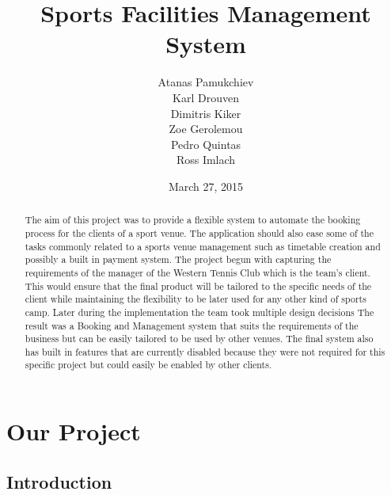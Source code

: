 \documentclass{l3proj}
\begin{document}
\title{Sports Facilities Management System}
\author{Atanas Pamukchiev \\
        Karl Drouven \\
        Dimitris Kiker \\
        Zoe Gerolemou \\
        Pedro Quintas\\
        Ross Imlach}
\date{March 27, 2015}
\maketitle
\begin{abstract}

The aim of this project was to provide a flexible system to automate the booking process for the clients of a sport venue. The application should also ease some of the tasks commonly related to a sports venue management such as timetable creation and possibly a built in payment system. The project begun with capturing the requirements of the manager of the Western Tennis Club which is the team's client. This would ensure that the final product will be tailored to the specific needs of the client while maintaining the flexibility to be later used for any other kind of sports camp. Later during the implementation the team took multiple design decisions  The result was a Booking and Management system that suits the requirements of the business but can be easily tailored to be used by other venues. The final system also has built in features that are currently disabled because they were not required for this specific project but could easily be enabled by other clients.

\end{abstract}
\educationalconsent
\tableofcontents

\chapter{Our Project}
\label{ourproject}

\section{Introduction}
\end{document}
